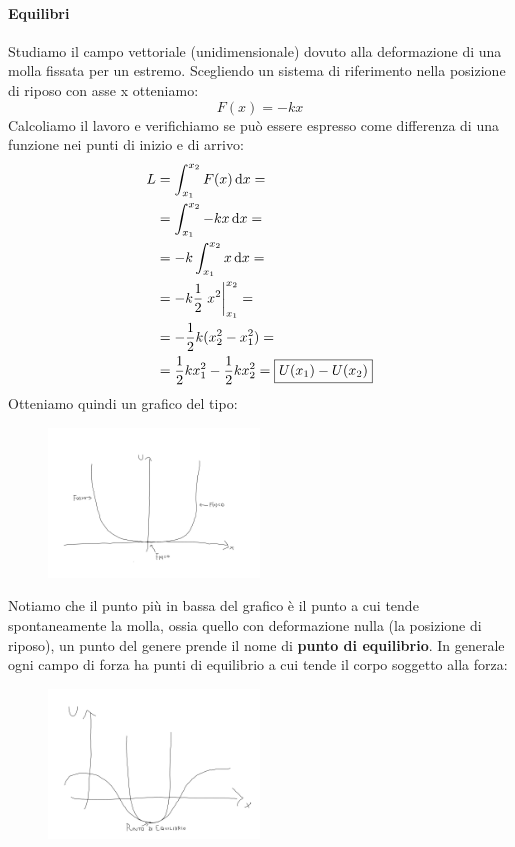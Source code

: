 \documentclass{report}
\begin{document}
\paragraph{Equilibri}
Studiamo il campo vettoriale (unidimensionale) dovuto alla deformazione di una molla fissata per un estremo. Scegliendo un sistema di riferimento nella posizione di riposo con asse x otteniamo:
\[F(x)=-kx\]
Calcoliamo il lavoro e verifichiamo se può essere espresso come differenza di una funzione nei punti di inizio e di arrivo:
\begin{equation}
\begin{split}
    L&=\int_{x_1}^{x_2}F(x)\dif x=\\
    &=\int_{x_1}^{x_2}-kx\dif x=\\
    &=-k\int_{x_1}^{x_2}x\dif x=\\
    &=-k\frac{1}{2}\eval{x^2}_{x_1}^{x_2}=\\
    &=-\frac{1}{2}k(x_2^2-x_1^2)=\\
    &=\frac{1}{2}kx_1^2-\frac{1}{2}kx_2^2=\boxed{U(x_1)-U(x_2)}
\end{split}
\end{equation}
Otteniamo quindi un grafico del tipo:
\begin{figure}[H]
    \centering
    \includegraphics[width=0.5\textwidth]{EnergiaMolla.png}
\end{figure}
Notiamo che il punto più in bassa del grafico è il punto a cui tende spontaneamente la molla, ossia quello con deformazione nulla (la posizione di riposo), un punto del genere prende il nome di \textbf{punto di equilibrio}. In generale ogni campo di forza ha punti di equilibrio a cui tende il corpo soggetto alla forza:
\begin{figure}[H]
    \centering
    \includegraphics[width=0.5\textwidth]{EquilibrioEnergia.png}
\end{figure}
\end{document}
